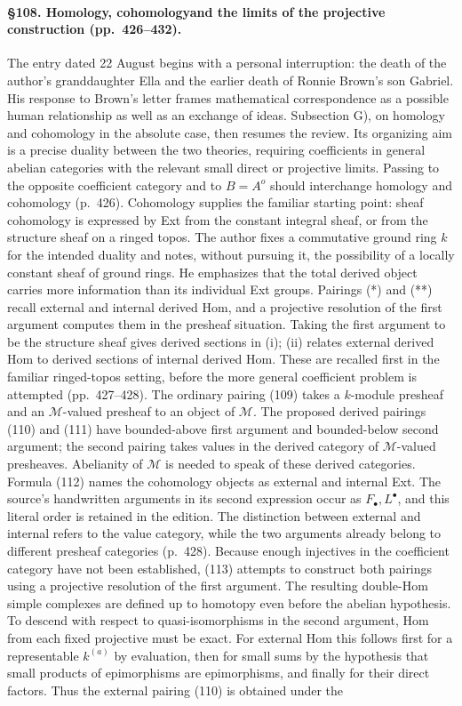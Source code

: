 \paragraph{\S108. Homology, cohomology\newline and the limits of the projective construction (pp.\ 426--432).}
The entry dated 22 August begins with a personal interruption: the death of the author's granddaughter Ella and the earlier death of Ronnie Brown's son Gabriel. His response to Brown's letter frames mathematical correspondence as a possible human relationship as well as an exchange of ideas. Subsection G), on homology and cohomology in the absolute case, then resumes the review. Its organizing aim is a precise duality between the two theories, requiring coefficients in general abelian categories with the relevant small direct or projective limits. Passing to the opposite coefficient category and to $B=A^o$ should interchange homology and cohomology (p.\ 426). Cohomology supplies the familiar starting point: sheaf cohomology is expressed by Ext from the constant integral sheaf, or from the structure sheaf on a ringed topos. The author fixes a commutative ground ring $k$ for the intended duality and notes, without pursuing it, the possibility of a locally constant sheaf of ground rings. He emphasizes that the total derived object carries more information than its individual Ext groups. Pairings (*) and (**) recall external and internal derived Hom, and a projective resolution of the first argument computes them in the presheaf situation. Taking the first argument to be the structure sheaf gives derived sections in (i); (ii) relates external derived Hom to derived sections of internal derived Hom. These are recalled first in the familiar ringed-topos setting, before the more general coefficient problem is attempted (pp.\ 427--428). The ordinary pairing (109) takes a $k$-module presheaf and an $\mathcal M$-valued presheaf to an object of $\mathcal M$. The proposed derived pairings (110) and (111) have bounded-above first argument and bounded-below second argument; the second pairing takes values in the derived category of $\mathcal M$-valued presheaves. Abelianity of $\mathcal M$ is needed to speak of these derived categories. Formula (112) names the cohomology objects as external and internal Ext. The source's handwritten arguments in its second expression occur as $F_\bullet,L^\bullet$, and this literal order is retained in the edition. The distinction between external and internal refers to the value category, while the two arguments already belong to different presheaf categories (p.\ 428). Because enough injectives in the coefficient category have not been established, (113) attempts to construct both pairings using a projective resolution of the first argument. The resulting double-Hom simple complexes are defined up to homotopy even before the abelian hypothesis. To descend with respect to quasi-isomorphisms in the second argument, Hom from each fixed projective must be exact. For external Hom this follows first for a representable $k^{(a)}$ by evaluation, then for small sums by the hypothesis that small products of epimorphisms are epimorphisms, and finally for their direct factors. Thus the external pairing (110) is obtained under the 